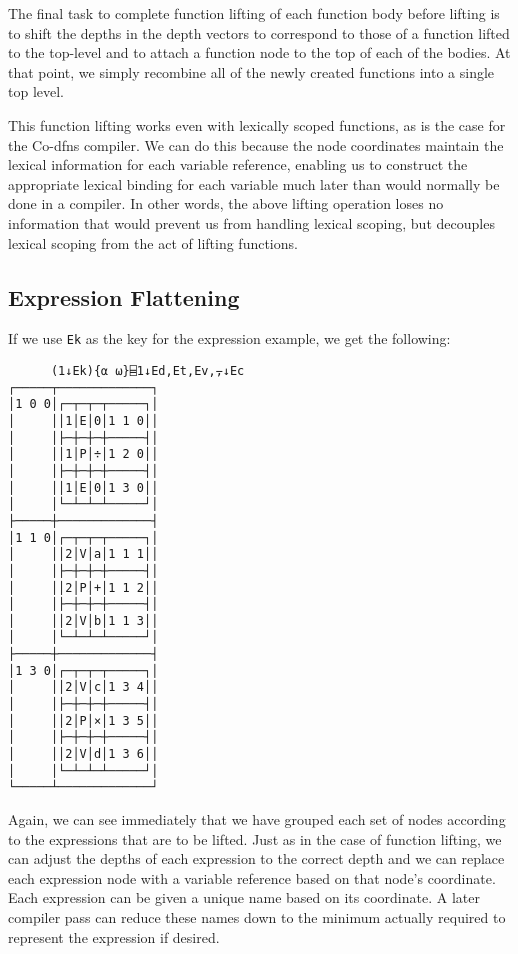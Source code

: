\documentclass[numbers,9pt]{sigplanconf}
\begin{document}
The final task to complete function lifting of each function
body before lifting is to shift the depths in the depth vectors
to correspond to those of a function lifted to the top-level and
to attach a function node to the top of each of the bodies. At that
point, we simply recombine all of the newly created functions into
a single top level.

This function lifting works even with lexically scoped functions, 
as is the case for the Co-dfns compiler.
We can do this because the node coordinates maintain the lexical information 
for each variable reference, enabling us to construct the appropriate lexical 
binding for each variable much later than would normally be done in a 
compiler. 
In other words, the above lifting operation loses no information that would 
prevent us from handling lexical scoping, but decouples lexical scoping 
from the act of lifting functions.

\subsection{Expression Flattening}

If we use \verb;Ek; as the key for the expression example, we get the
following:

\begin{verbatim}
      (1↓Ek){⍺ ⍵}⌸1↓Ed,Et,Ev,⍪↓Ec
┌─────┬─────────────┐
│1 0 0│┌─┬─┬─┬─────┐│
│     ││1│E│0│1 1 0││
│     │├─┼─┼─┼─────┤│
│     ││1│P│÷│1 2 0││
│     │├─┼─┼─┼─────┤│
│     ││1│E│0│1 3 0││
│     │└─┴─┴─┴─────┘│
├─────┼─────────────┤
│1 1 0│┌─┬─┬─┬─────┐│
│     ││2│V│a│1 1 1││
│     │├─┼─┼─┼─────┤│
│     ││2│P│+│1 1 2││
│     │├─┼─┼─┼─────┤│
│     ││2│V│b│1 1 3││
│     │└─┴─┴─┴─────┘│
├─────┼─────────────┤
│1 3 0│┌─┬─┬─┬─────┐│
│     ││2│V│c│1 3 4││
│     │├─┼─┼─┼─────┤│
│     ││2│P│×│1 3 5││
│     │├─┼─┼─┼─────┤│
│     ││2│V│d│1 3 6││
│     │└─┴─┴─┴─────┘│
└─────┴─────────────┘
\end{verbatim}

Again, we can see immediately that we have grouped each set of nodes
according to the expressions that are to be lifted. Just as in the
case of function lifting, we can adjust the depths of each expression
to the correct depth and we can replace each expression node with a
variable reference based on that node’s coordinate. Each expression
can be given a unique name based on its coordinate. A later compiler
pass can reduce these names down to the minimum actually required to
represent the expression if desired.
\end{document}
